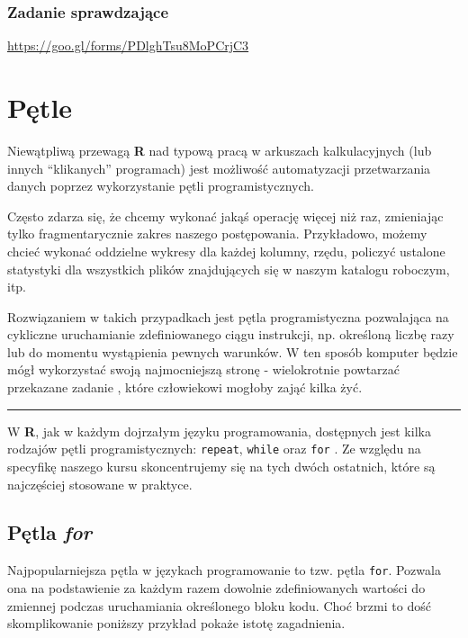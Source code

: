 \documentclass[]{book}
\theoremstyle{definition}
\theoremstyle{definition}
\theoremstyle{definition}
\theoremstyle{remark}
\begin{document}
\subsection*{Zadanie sprawdzające}\label{zadanie-sprawdzajace}

\url{https://goo.gl/forms/PDlghTsu8MoPCrjC3}

\chapter{Pętle}\label{petle}

Niewątpliwą przewagą \textbf{R} nad typową pracą w arkuszach
kalkulacyjnych (lub innych ``klikanych'' programach) jest możliwość
automatyzacji przetwarzania danych poprzez wykorzystanie pętli
programistycznych.

Często zdarza się, że chcemy wykonać jakąś operację więcej niż raz,
zmieniając tylko fragmentarycznie zakres naszego postępowania.
Przykładowo, możemy chcieć wykonać oddzielne wykresy dla każdej kolumny,
rzędu, policzyć ustalone statystyki dla wszystkich plików znajdujących
się w naszym katalogu roboczym, itp.

Rozwiązaniem w takich przypadkach jest pętla programistyczna pozwalająca
na cykliczne uruchamianie zdefiniowanego ciągu instrukcji, np. określoną
liczbę razy lub do momentu wystąpienia pewnych warunków. W ten sposób
komputer będzie mógł wykorzystać swoją najmocniejszą stronę -
wielokrotnie powtarzać przekazane zadanie \citep{biecek2016}, które
człowiekowi mogłoby zająć kilka żyć.

\begin{center}\rule{0.5\linewidth}{\linethickness}\end{center}

W \textbf{R}, jak w każdym dojrzałym języku programowania, dostępnych
jest kilka rodzajów pętli programistycznych: \texttt{repeat},
\texttt{while} oraz \texttt{for} \citep{gagolewski2016}. Ze względu na
specyfikę naszego kursu skoncentrujemy się na tych dwóch ostatnich,
które są najczęściej stosowane w praktyce.

\section{\texorpdfstring{Pętla \emph{for}}{Pętla for}}\label{petla-for}

Najpopularniejsza pętla w językach programowanie to tzw. pętla
\texttt{for}. Pozwala ona na podstawienie za każdym razem dowolnie
zdefiniowanych wartości do zmiennej podczas uruchamiania określonego
bloku kodu. Choć brzmi to dość skomplikowanie poniższy przykład pokaże
istotę zagadnienia.
\end{document}
